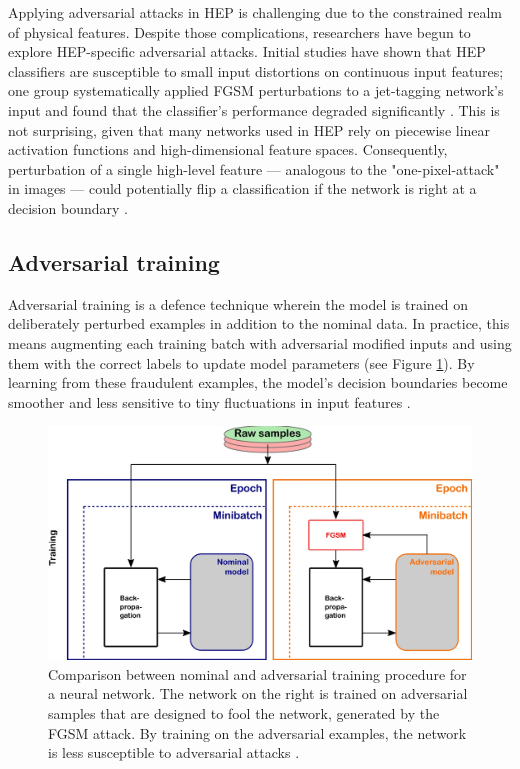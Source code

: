 Applying adversarial attacks in HEP is challenging due to the constrained realm of physical features. Despite those complications, researchers have begun to explore HEP-specific adversarial attacks. Initial studies have shown that HEP classifiers are susceptible to small input distortions on continuous input features; one group systematically applied FGSM perturbations to a jet-tagging network's input and found that the classifier's performance degraded significantly \cite{Stein2022}. This is not surprising, given that many networks used in HEP rely on piecewise linear activation functions and high-dimensional feature spaces. Consequently, perturbation of a single high-level feature — analogous to the "one-pixel-attack" in images — could potentially flip a classification if the network is right at a decision boundary \cite{Stein2022}.

\subsection{Adversarial training}

Adversarial training is a defence technique wherein the model is trained on deliberately perturbed examples in addition to the nominal data. In practice, this means augmenting each training batch with adversarial modified inputs and using them with the correct labels to update model parameters (see Figure \ref{fig:adversarial_training}). By learning from these fraudulent examples, the model's decision boundaries become smoother and less sensitive to tiny fluctuations in input features \cite{goodfellow2015explainingharnessingadversarialexamples}.

\begin{figure}
    \centering
    \includegraphics[width=0.8\linewidth]{media/adversarial_training.png}
    \caption{Comparison between nominal and adversarial training procedure for a neural network. The network on the right is trained on adversarial samples that are designed to fool the network, generated by the FGSM attack. By training on the adversarial examples, the network is less susceptible to adversarial attacks \cite{Stein2022}.}
    \label{fig:adversarial_training}
\end{figure}

